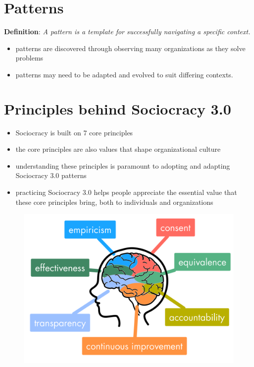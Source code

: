 \section{Patterns}
\label{patterns}

\textbf{Definition}: \emph{A pattern is a template for successfully navigating a specific context.}

\begin{itemize}
\item patterns are discovered through observing many organizations as they solve problems

\item patterns may need to be adapted and evolved to suit differing contexts.

\end{itemize}

\section{Principles behind Sociocracy 3.0}
\label{principlesbehindsociocracy3.0}

\begin{itemize}
\item Sociocracy is built on 7 core principles

\item the core principles are also values that shape organizational culture

\item understanding these principles is paramount to adopting and adapting Sociocracy 3.0 patterns

\item practicing Sociocracy 3.0 helps people appreciate the essential value that these core principles bring, both to individuals and organizations

\end{itemize}

\begin{figure}[htbp]
\centering
\includegraphics[keepaspectratio,width=\textwidth,height=0.75\textheight]{img/principles/s3-principles-v3a.png}
\end{figure}


